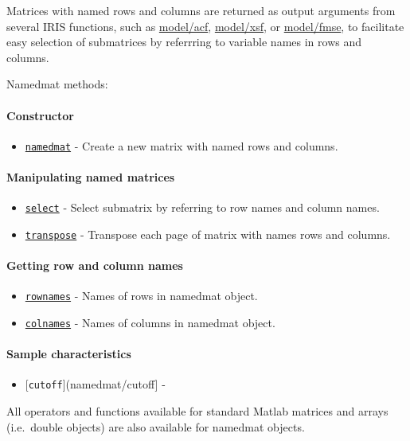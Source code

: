 

	Matrices with named rows and columns are returned as output arguments
from several IRIS functions, such as \url{model/acf}, \url{model/xsf},
or \url{model/fmse}, to facilitate easy selection of submatrices by
referrring to variable names in rows and columns.

Namedmat methods:

\paragraph{Constructor}

\begin{itemize}
\itemsep1pt\parskip0pt
\item
  \href{namedmat/namedmat}{\texttt{namedmat}} - Create a new matrix with
  named rows and columns.
\end{itemize}

\paragraph{Manipulating named
matrices}

\begin{itemize}
\itemsep1pt\parskip0pt
\item
  \href{namedmat/select}{\texttt{select}} - Select submatrix by
  referring to row names and column names.
\item
  \href{namedmat/transpose}{\texttt{transpose}} - Transpose each page of
  matrix with names rows and columns.
\end{itemize}

\paragraph{Getting row and column
names}

\begin{itemize}
\itemsep1pt\parskip0pt
\item
  \href{namedmat/rownames}{\texttt{rownames}} - Names of rows in
  namedmat object.
\item
  \href{namedmat/colnames}{\texttt{colnames}} - Names of columns in
  namedmat object.
\end{itemize}

\paragraph{Sample characteristics}

\begin{itemize}
\itemsep1pt\parskip0pt
\item
  {[}\texttt{cutoff}{]}(namedmat/cutoff{]} -
\end{itemize}

All operators and functions available for standard Matlab matrices and
arrays (i.e.~double objects) are also available for namedmat objects.



